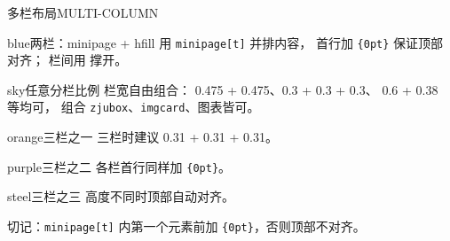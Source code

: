 \documentclass[10pt,aspectratio=169]{beamer}
\begin{document}
\begin{frame}{多栏布局}{MULTI-COLUMN}
  \begin{minipage}[t]{0.475\textwidth}
    \vspace{0pt}%
    \begin{zjubox}{blue}{两栏：minipage + hfill}
      {\footnotesize 用 \texttt{minipage[t]} 并排内容，
      首行加 \texttt{\string\vspace\{0pt\}} 保证顶部对齐；
      栏间用 \texttt{\string\hfill} 撑开。}
    \end{zjubox}
  \end{minipage}\hfill
  \begin{minipage}[t]{0.475\textwidth}
    \vspace{0pt}%
    \begin{zjubox}{sky}{任意分栏比例}
      {\footnotesize 栏宽自由组合：
      0.475 + 0.475、0.3 + 0.3 + 0.3、
      0.6 + 0.38 等均可，
      组合 \texttt{zjubox}、\texttt{imgcard}、图表皆可。}
    \end{zjubox}
  \end{minipage}
  \vspace{1.2mm}

  \begin{minipage}[t]{0.31\textwidth}
    \vspace{0pt}%
    \begin{zjubox}{orange}{三栏之一}
      {\footnotesize 三栏时建议 0.31 + 0.31 + 0.31。}
    \end{zjubox}
  \end{minipage}\hfill
  \begin{minipage}[t]{0.31\textwidth}
    \vspace{0pt}%
    \begin{zjubox}{purple}{三栏之二}
      {\footnotesize 各栏首行同样加
      \texttt{\string\vspace\{0pt\}}。}
    \end{zjubox}
  \end{minipage}\hfill
  \begin{minipage}[t]{0.31\textwidth}
    \vspace{0pt}%
    \begin{zjubox}{steel}{三栏之三}
      {\footnotesize 高度不同时顶部自动对齐。}
    \end{zjubox}
  \end{minipage}

  \begin{takeaway}
    切记：\texttt{minipage[t]} 内第一个元素前加 \texttt{\string\vspace\{0pt\}}，否则顶部不对齐。
  \end{takeaway}
\end{frame}
\end{document}
